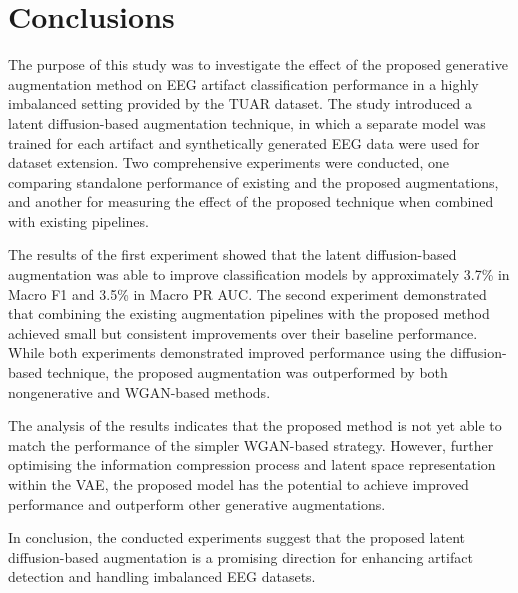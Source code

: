 \chapter{Conclusions}

The purpose of this study was to investigate the effect of the proposed generative augmentation method on EEG artifact classification performance in a highly imbalanced setting provided by the TUAR dataset. The study introduced a latent diffusion-based augmentation technique, in which a separate model was trained for each artifact and synthetically generated EEG data were used for dataset extension. Two comprehensive experiments were conducted, one comparing standalone performance of existing and the proposed augmentations, and another for measuring the effect of the proposed technique when combined with existing pipelines.

The results of the first experiment showed that the latent diffusion-based augmentation was able to improve classification models by approximately 3.7\% in Macro F1 and 3.5\% in Macro PR AUC. The second experiment demonstrated that combining the existing augmentation pipelines with the proposed method achieved small but consistent improvements over their baseline performance. While both experiments demonstrated improved performance using the diffusion-based technique, the proposed augmentation was outperformed by both nongenerative and WGAN-based methods. 

The analysis of the results indicates that the proposed method is not yet able to match the performance of the simpler WGAN-based strategy. However, further optimising the information compression process and latent space representation within the VAE, the proposed model has the potential to achieve improved performance and outperform other generative augmentations.

In conclusion, the conducted experiments suggest that the proposed latent diffusion-based augmentation is a promising direction for enhancing artifact detection and handling imbalanced EEG datasets.